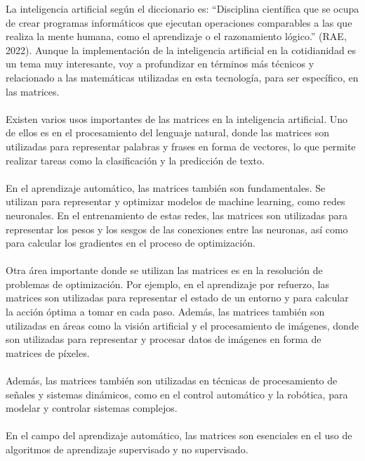 \documentclass{article}
\theoremstyle{mytheoremstyle}
\theoremstyle{mytheoremstyle}
\theoremstyle{myproblemstyle}
\begin{document}
La inteligencia artificial según el diccionario es: “Disciplina científica que se ocupa de crear programas informáticos que ejecutan operaciones comparables a las que realiza la mente humana, como el aprendizaje o el razonamiento lógico.” (RAE, 2022). Aunque la implementación de la inteligencia artificial en la cotidianidad es un tema muy interesante, voy a profundizar en términos más técnicos y relacionado a las matemáticas utilizadas en esta tecnología, para ser específico, en las matrices.
\\
\\
Existen varios usos importantes de las matrices en la inteligencia artificial. Uno de ellos es en el procesamiento del lenguaje natural, donde las matrices son utilizadas para representar palabras y frases en forma de vectores, lo que permite realizar tareas como la clasificación y la predicción de texto.
\\
\\
En el aprendizaje automático, las matrices también son fundamentales. Se utilizan para representar y optimizar modelos de machine learning, como redes neuronales. En el entrenamiento de estas redes, las matrices son utilizadas para representar los pesos y los sesgos de las conexiones entre las neuronas, así como para calcular los gradientes en el proceso de optimización.
\\
\\
Otra área importante donde se utilizan las matrices es en la resolución de problemas de optimización. Por ejemplo, en el aprendizaje por refuerzo, las matrices son utilizadas para representar el estado de un entorno y para calcular la acción óptima a tomar en cada paso.
Además, las matrices también son utilizadas en áreas como la visión artificial y el procesamiento de imágenes, donde son utilizadas para representar y procesar datos de imágenes en forma de matrices de píxeles.
\\
\\
Además, las matrices también son utilizadas en técnicas de procesamiento de señales y sistemas dinámicos, como en el control automático y la robótica, para modelar y controlar sistemas complejos.
\\
\\
En el campo del aprendizaje automático, las matrices son esenciales en el uso de algoritmos de aprendizaje supervisado y no supervisado. 
\end{document}
